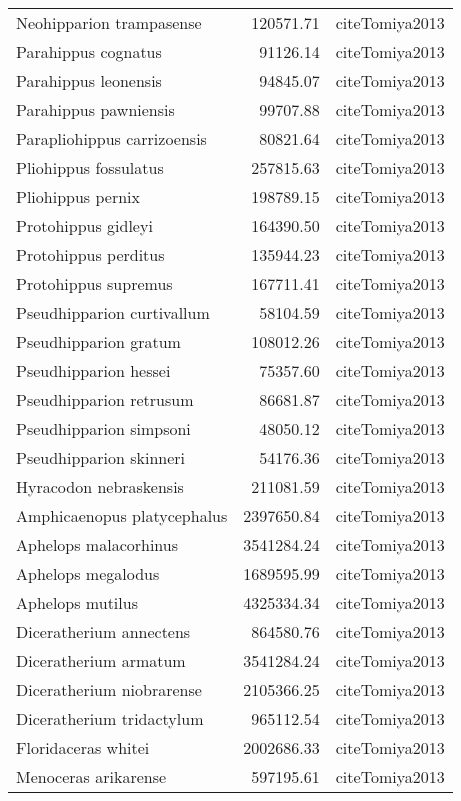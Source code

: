 \begin{table}[ht]
\begin{tabular}{lrl}
  Neohipparion trampasense & 120571.71 & cite{Tomiya2013} \\ 
  Parahippus cognatus & 91126.14 & cite{Tomiya2013} \\ 
  Parahippus leonensis & 94845.07 & cite{Tomiya2013} \\ 
  Parahippus pawniensis & 99707.88 & cite{Tomiya2013} \\ 
  Parapliohippus carrizoensis & 80821.64 & cite{Tomiya2013} \\ 
  Pliohippus fossulatus & 257815.63 & cite{Tomiya2013} \\ 
  Pliohippus pernix & 198789.15 & cite{Tomiya2013} \\ 
  Protohippus gidleyi & 164390.50 & cite{Tomiya2013} \\ 
  Protohippus perditus & 135944.23 & cite{Tomiya2013} \\ 
  Protohippus supremus & 167711.41 & cite{Tomiya2013} \\ 
  Pseudhipparion curtivallum & 58104.59 & cite{Tomiya2013} \\ 
  Pseudhipparion gratum & 108012.26 & cite{Tomiya2013} \\ 
  Pseudhipparion hessei & 75357.60 & cite{Tomiya2013} \\ 
  Pseudhipparion retrusum & 86681.87 & cite{Tomiya2013} \\ 
  Pseudhipparion simpsoni & 48050.12 & cite{Tomiya2013} \\ 
  Pseudhipparion skinneri & 54176.36 & cite{Tomiya2013} \\ 
  Hyracodon nebraskensis & 211081.59 & cite{Tomiya2013} \\ 
  Amphicaenopus platycephalus & 2397650.84 & cite{Tomiya2013} \\ 
  Aphelops malacorhinus & 3541284.24 & cite{Tomiya2013} \\ 
  Aphelops megalodus & 1689595.99 & cite{Tomiya2013} \\ 
  Aphelops mutilus & 4325334.34 & cite{Tomiya2013} \\ 
  Diceratherium annectens & 864580.76 & cite{Tomiya2013} \\ 
  Diceratherium armatum & 3541284.24 & cite{Tomiya2013} \\ 
  Diceratherium niobrarense & 2105366.25 & cite{Tomiya2013} \\ 
  Diceratherium tridactylum & 965112.54 & cite{Tomiya2013} \\ 
  Floridaceras whitei & 2002686.33 & cite{Tomiya2013} \\ 
  Menoceras arikarense & 597195.61 & cite{Tomiya2013} \\ 

\end{tabular}
\end{table}
